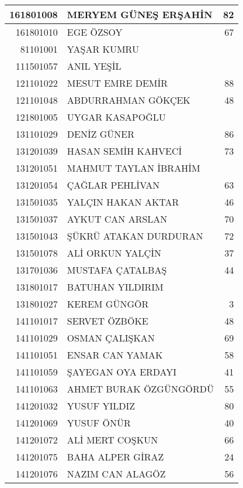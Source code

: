 \documentclass[12pt]{article}
\begin{document}
\begin{longtable}{||r||l||r||}
    161801008 & MERYEM GÜNEŞ ERŞAHİN & 82 \\
    \midrule
    161801010 & EGE ÖZSOY & 67 \\
    \midrule
    81101001 & YAŞAR KUMRU &  \\
    \midrule
    111501057 & ANIL YEŞİL &  \\
    \midrule
    121101022 & MESUT EMRE DEMİR & 88 \\
    \midrule
    121101048 & ABDURRAHMAN GÖKÇEK & 48 \\
    \midrule
    121801005 & UYGAR KASAPOĞLU &  \\
    \midrule
    131101029 & DENİZ GÜNER & \cellcolor[rgb]{ 1,  1,  0} 86 \\
    \midrule
    131201039 & HASAN SEMİH KAHVECİ & 73 \\
    \midrule
    131201051 & MAHMUT TAYLAN İBRAHİM &  \\
    \midrule
    131201054 & ÇAĞLAR PEHLİVAN & 63 \\
    \midrule
    131501035 & YALÇIN HAKAN AKTAR & 46 \\
    \midrule
    131501037 & AYKUT CAN ARSLAN & 70 \\
    \midrule
    131501043 & ŞÜKRÜ ATAKAN DURDURAN & 72 \\
    \midrule
    131501078 & ALİ ORKUN YALÇİN & 37 \\
    \midrule
    131701036 & MUSTAFA ÇATALBAŞ & 44 \\
    \midrule
    131801017 & BATUHAN YILDIRIM &  \\
    \midrule
    131801027 & KEREM GÜNGÖR & 3 \\
    \midrule
    141101017 & SERVET ÖZBÖKE & 48 \\
    \midrule
    141101029 & OSMAN ÇALIŞKAN & 69 \\
    \midrule
    141101051 & ENSAR CAN YAMAK & 58 \\
    \midrule
    141101059 & ŞAYEGAN OYA ERDAYI & 41 \\
    \midrule
    141101063 & AHMET BURAK ÖZGÜNGÖRDÜ & 55 \\
    \midrule
    141201032 & YUSUF YILDIZ & \cellcolor[rgb]{ 1,  1,  0} 80 \\
    \midrule
    141201069 & YUSUF ÖNÜR & 40 \\
    \midrule
    141201072 & ALİ MERT COŞKUN & 66 \\
    \midrule
    141201075 & BAHA ALPER GİRAZ & 24 \\
    \midrule
    141201076 & NAZIM CAN ALAGÖZ & 56 \\

\end{longtable}
\end{document}
